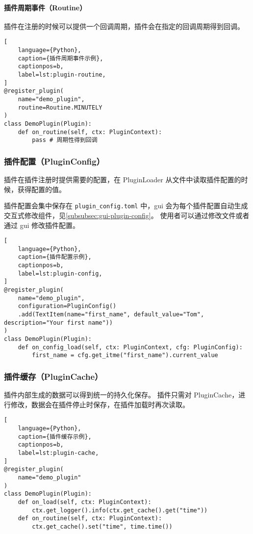 \paragraph{插件周期事件（Routine）}\label{para:routine}
插件在注册的时候可以提供一个回调周期，插件会在指定的回调周期得到回调。

\begin{lstlisting}[
    language={Python},
    caption={插件周期事件示例},
    captionpos=b,
    label=lst:plugin-routine,
]
@register_plugin(
    name="demo_plugin",
    routine=Routine.MINUTELY
)
class DemoPlugin(Plugin):
    def on_routine(self, ctx: PluginContext):
        pass # 周期性得到回调\end{lstlisting}

\subsubsection{插件配置（PluginConfig）}
插件在插件注册时提供需要的配置，在 PluginLoader 从文件中读取插件配置的时候，获得配置的值。

插件配置会集中保存在 \verb`plugin_config.toml` 中，gui
会为每个插件配置自动生成交互式修改组件，见\ref{subsubsec:gui-plugin-config}。
使用者可以通过修改文件或者通过 gui 修改插件配置。

\begin{lstlisting}[
    language={Python},
    caption={插件配置示例},
    captionpos=b,
    label=lst:plugin-config,
]
@register_plugin(
    name="demo_plugin",
    configuration=PluginConfig()
    .add(TextItem(name="first_name", default_value="Tom", description="Your first name"))
)
class DemoPlugin(Plugin):
    def on_config_load(self, ctx: PluginContext, cfg: PluginConfig):
        first_name = cfg.get_itme("first_name").current_value\end{lstlisting}

\subsubsection{插件缓存（PluginCache）}
插件内部生成的数据可以得到统一的持久化保存。
插件只需对 PluginCache，进行修改，数据会在插件停止时保存，在插件加载时再次读取。

\begin{lstlisting}[
    language={Python},
    caption={插件缓存示例},
    captionpos=b,
    label=lst:plugin-cache,
]
@register_plugin(
    name="demo_plugin"
)
class DemoPlugin(Plugin):
    def on_load(self, ctx: PluginContext):
        ctx.get_logger().info(ctx.get_cache().get("time"))
    def on_routine(self, ctx: PluginContext):
        ctx.get_cache().set("time", time.time())\end{lstlisting}

